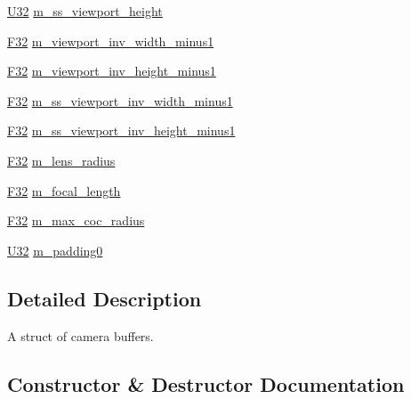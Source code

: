 \begin{DoxyCompactItemize}
\hyperlink{namespacemage_a41c104c036fba3756a74e19f793eeaa1}{U32} \hyperlink{structmage_1_1_camera_buffer_a6bbc5a57e9f456518afacf0a0e5633ed}{m\+\_\+ss\+\_\+viewport\+\_\+height}
\item 
\hyperlink{namespacemage_aa97e833b45f06d60a0a9c4fc22ae02c0}{F32} \hyperlink{structmage_1_1_camera_buffer_a3d56a38eb30fb0f0778d23f61f9988fa}{m\+\_\+viewport\+\_\+inv\+\_\+width\+\_\+minus1}
\item 
\hyperlink{namespacemage_aa97e833b45f06d60a0a9c4fc22ae02c0}{F32} \hyperlink{structmage_1_1_camera_buffer_a05564cd690597c4700ca292c942c0737}{m\+\_\+viewport\+\_\+inv\+\_\+height\+\_\+minus1}
\item 
\hyperlink{namespacemage_aa97e833b45f06d60a0a9c4fc22ae02c0}{F32} \hyperlink{structmage_1_1_camera_buffer_ad881a3acbf1eed761374a50296e35e47}{m\+\_\+ss\+\_\+viewport\+\_\+inv\+\_\+width\+\_\+minus1}
\item 
\hyperlink{namespacemage_aa97e833b45f06d60a0a9c4fc22ae02c0}{F32} \hyperlink{structmage_1_1_camera_buffer_a62f3a9c95c3e3cecfc1744de82ac2ca2}{m\+\_\+ss\+\_\+viewport\+\_\+inv\+\_\+height\+\_\+minus1}
\item 
\hyperlink{namespacemage_aa97e833b45f06d60a0a9c4fc22ae02c0}{F32} \hyperlink{structmage_1_1_camera_buffer_ac3b147c3f8971a8b06bfcb3bd971179c}{m\+\_\+lens\+\_\+radius}
\item 
\hyperlink{namespacemage_aa97e833b45f06d60a0a9c4fc22ae02c0}{F32} \hyperlink{structmage_1_1_camera_buffer_a5ecb7ec90a7bc1900846d53488315d33}{m\+\_\+focal\+\_\+length}
\item 
\hyperlink{namespacemage_aa97e833b45f06d60a0a9c4fc22ae02c0}{F32} \hyperlink{structmage_1_1_camera_buffer_a324324132e7cd8d0d0259a47d0305430}{m\+\_\+max\+\_\+coc\+\_\+radius}
\item 
\hyperlink{namespacemage_a41c104c036fba3756a74e19f793eeaa1}{U32} \hyperlink{structmage_1_1_camera_buffer_a56019b41362cd7ddb5d747ed4705d854}{m\+\_\+padding0}
\end{DoxyCompactItemize}


\subsection{Detailed Description}
A struct of camera buffers. 

\subsection{Constructor \& Destructor Documentation}
\hypertarget{structmage_1_1_camera_buffer_aca0a689a43c84fdc02e72d792b1a0ab3}{}\label{structmage_1_1_camera_buffer_aca0a689a43c84fdc02e72d792b1a0ab3} 
